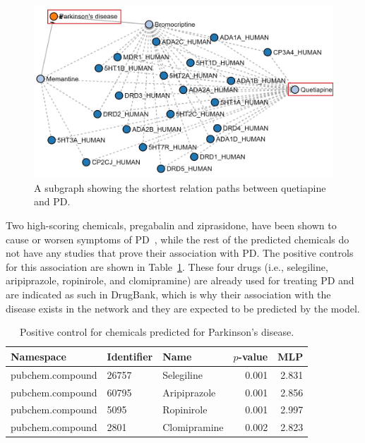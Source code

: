 \begin{figure}[h!]
    \centering
    \includegraphics[scale=0.6]
    {figures/parkinson_quetiapine.jpg}
    \caption[Quetiapine's path subgraph in Parkinson's disease]{\label{fig:parkinson_quetiapine} A subgraph showing the shortest relation paths between quetiapine and \ac{PD}.}
\end{figure}

Two high-scoring chemicals, pregabalin and ziprasidone, have been shown to cause or worsen symptoms of \ac{PD}~\cite{perez_lloret_pregabalin-induced_2009, younce_systematic_2019}, while the rest of the predicted chemicals do not have any studies that prove their association with \ac{PD}.
The positive controls for this association are shown in Table~\ref{tab:ps_PD}.
These four drugs (i.e., selegiline, aripiprazole, ropinirole, and clomipramine) are already used for treating \ac{PD} and are indicated as such in DrugBank, which is why their association with the disease exists in the network and they are expected to be predicted by the model.

\begin{table}
    \centering
    \begin{tabular}{|l|l|l|r|r|}
        \hline
        \textbf{Namespace} & \textbf{Identifier} & \textbf{Name} & \textbf{$p$-value} & \textbf{MLP} \\
        \hline
        pubchem.compound & 26757 & Selegiline & 0.001 & 2.831 \\
        \hline
        pubchem.compound & 60795 & Aripiprazole & 0.001 & 2.856 \\
        \hline
        pubchem.compound & 5095 & Ropinirole & 0.001 & 2.997 \\
        \hline
        pubchem.compound & 2801 & Clomipramine & 0.002 & 2.823 \\
        \hline
    \end{tabular}
    \caption{Positive control for chemicals predicted for Parkinson's disease.}
    \label{tab:ps_PD}
\end{table}

